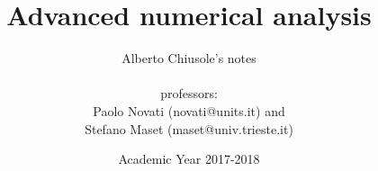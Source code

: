 \documentclass[a4paper,12pt]{book}
\begin{document}
	
	\title{Advanced numerical analysis}
	\author{Alberto Chiusole's notes\\\\
		professors:\\
		Paolo Novati (novati@units.it) and\\
		Stefano Maset (maset@univ.trieste.it)}
	\date{Academic Year 2017-2018}
	
	\frontmatter
	\maketitle
	\tableofcontents
	
	\mainmatter
	
	
	
	
	\backmatter
	
\end{document}
